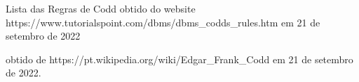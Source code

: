 \documentclass[
12pt,		%
openright,	%
twoside,  %
a4paper,			%
chapter=TITLE,		%
english,			%
french,				%
spanish,			%
brazil				%
]{USPSC-classe/USPSC}
\begin{document}
\begin{flushleft}
\begin{flushleft}
\begin{flushleft}
\begin{flushleft}
\begin{flushleft}
\begin{flushleft}
\begin{flushleft}
\begin{flushleft}
\begin{flushleft}
\begin{flushleft}
[TutorialsPoint, 2022] Lista das Regras de Codd obtido do website https://www.tutorialspoint.com/dbms/dbms\_codds\_rules.htm em 21 de setembro de 2022
\end{flushleft}


\end{flushleft}


\end{flushleft}


\end{flushleft}


\end{flushleft}


\end{flushleft}


\end{flushleft}


\end{flushleft}


\end{flushleft}


\end{flushleft}


\begin{flushleft}
\begin{flushleft}
\begin{flushleft}
\begin{flushleft}
\begin{flushleft}
\begin{flushleft}
\begin{flushleft}
\begin{flushleft}
\begin{flushleft}
\begin{flushleft}
 obtido de https://pt.wikipedia.org/wiki/Edgar\_Frank\_Codd em 21 de setembro de 2022.
\end{flushleft}


\end{flushleft}


\end{flushleft}


\end{flushleft}


\end{flushleft}


\end{flushleft}


\end{flushleft}


\end{flushleft}


\end{flushleft}


\end{flushleft}
\end{document}
